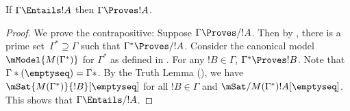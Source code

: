 \documentclass[../../../include/open-logic-section]{subfiles}
\begin{document}


\begin{thm}
  If $\Gamma \Entails !A$ then $\Gamma \Proves !A$.
\end{thm}

\begin{proof}
  We prove the contrapositive: Suppose $\Gamma \Proves/ !A$. Then by
  , there is a prime set~$\Gamma^*
  \supseteq \Gamma$ such that $\Gamma^* \Proves/ !A$. Consider the
  canonical model~$\mModel{M(\Gamma^*)}$ for $\Gamma^*$ as defined in
  . For any $!B \in \Gamma$, $\Gamma^*
  \Proves !B$. Note that $\Gamma*(\emptyseq) = \Gamma*$. By the Truth
  Lemma (), we have
  $\mSat{M(\Gamma^*)}{!B}[\emptyseq]$ for all $!B \in \Gamma$ and
  $\mSat/{M(\Gamma^*)}{!A}[\emptyseq]$. This shows that $\Gamma
  \Entails/ !A$.
\end{proof}
\end{document}
